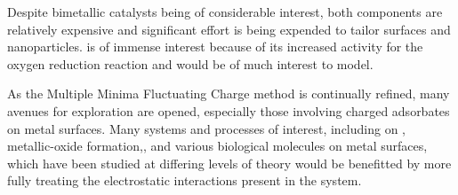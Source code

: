 Despite  bimetallic catalysts being of considerable interest,
both components are relatively expensive and significant effort is being
expended to tailor  surfaces and nanoparticles.
 is of immense interest because of its increased activity for
the oxygen reduction reaction and would be of much interest to
model.\citep{Tuaev:2013fk, Stamenkovic:2007kk,Sneed:2014fj}

As the Multiple Minima Fluctuating Charge method is continually refined, many
avenues for exploration are opened, especially those involving charged
adsorbates on metal surfaces. Many systems and processes of interest, including
 on ,\citep{Xu:0dz} metallic-oxide
formation,\citep{Streitz:1994mw, Fantauzzi:2014pb, Lloyd:2016jt}, and various
biological molecules on metal surfaces,\citep{Padmos:0qf, Mete:2015rc} which
have been studied at differing levels of theory would be benefitted by more
fully treating the electrostatic interactions present in the system. 
